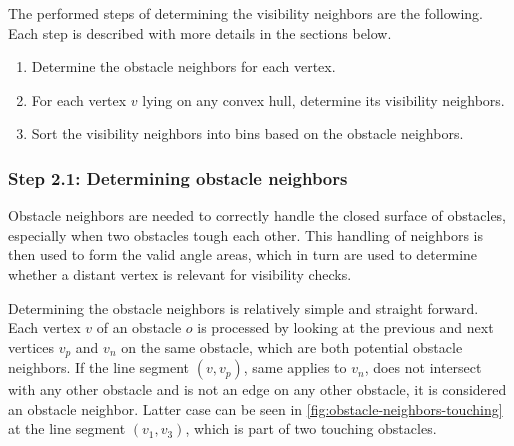 			The performed steps of determining the visibility neighbors are the following.
			Each step is described with more details in the sections below.
			\begin{enumerate}[leftmargin=2.25em+\widthof{2.},label={2.\arabic*.}]
				\item Determine the obstacle neighbors for each vertex.
				\item For each vertex $v$ lying on any convex hull, determine its visibility neighbors.
				\item Sort the visibility neighbors into bins based on the obstacle neighbors.
			\end{enumerate}
		
		\subsubsection{Step 2.1: Determining obstacle neighbors}
			
			Obstacle neighbors are needed to correctly handle the closed surface of obstacles, especially when two obstacles tough each other.
			This handling of neighbors is then used to form the valid angle areas, which in turn are used to determine whether a distant vertex is relevant for visibility checks.
			
			Determining the obstacle neighbors is relatively simple and straight forward.
			Each vertex $v$ of an obstacle $o$ is processed by looking at the previous and next vertices $v_p$ and $v_n$ on the same obstacle, which are both potential obstacle neighbors.
			If the line segment $(v, v_p)$, same applies to $v_n$, does not intersect with any other obstacle and is not an edge on any other obstacle, it is considered an obstacle neighbor.
			Latter case can be seen in \cref{fig:obstacle-neighbors-touching} at the line segment $(v_1, v_3)$, which is part of two touching obstacles.
						
